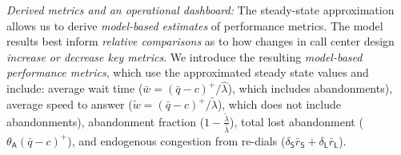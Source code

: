 \documentclass[manuscript,screen,authorversion]{acmart}
\begin{document}



\textit{Derived metrics and an operational dashboard: }The steady-state approximation allows us to derive \textit{model-based estimates} of performance metrics. The model results best inform \textit{relative comparisons} as to how changes in call center design \textit{increase or decrease key metrics}. We introduce the resulting \textit{model-based performance metrics}, which use the approximated steady state values and include: average wait time  ($\bar{w} = (\bar{q}-c)^+ / \hat \lambda$), which includes abandonments),  average speed to answer ($\tilde{w} = (\bar{q}-c)^+ /\tilde \lambda$), which does not include abandonments), abandonment fraction ($1 - \frac{\tilde{\lambda}}{\hat\lambda}$), total lost abandonment ($\theta_{\mathsf{A}} (\bar{q}-c)^+$), and endogenous congestion from re-dials ($ \delta_{\mathsf{S}} \bar r_{\mathsf{S}} + \delta_{\mathsf{L}} \bar r_{\mathsf{L}}$). 

\end{document}
